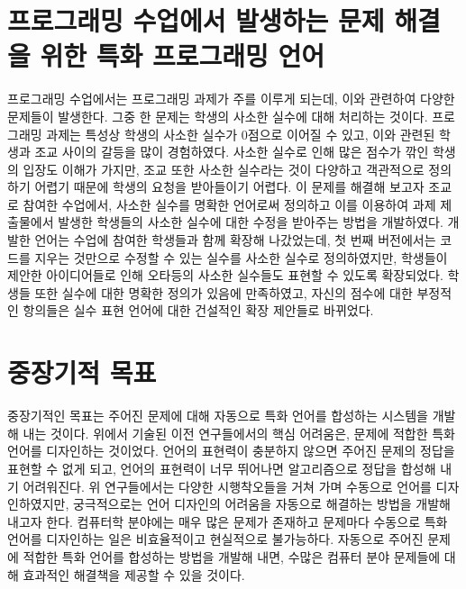 \documentclass[11pt]{article}
\begin{document}
\begin{spacing}{1.145}
\section{프로그래밍 수업에서 발생하는 문제 해결을 위한 특화 프로그래밍 언어}

프로그래밍 수업에서는 프로그래밍 과제가 주를 이루게 되는데, 이와 관련하여 다양한 문제들이 발생한다.
%
그중 한 문제는 학생의 사소한 실수에 대해 처리하는 것이다.
%
프로그래밍 과제는 특성상 학생의 사소한 실수가 0점으로 이어질 수 있고, 이와 관련된 학생과 조교 사이의 갈등을 많이 경험하였다.
%
사소한 실수로 인해 많은 점수가 깎인 학생의 입장도 이해가 가지만, 조교 또한 사소한 실수라는 것이 다양하고 객관적으로 정의하기 어렵기 때문에 학생의 요청을 받아들이기 어렵다.
%
이 문제를 해결해 보고자 조교로 참여한 수업에서, 사소한 실수를 명확한 언어로써 정의하고 이를 이용하여 과제 제출물에서 발생한 학생들의 사소한 실수에 대한 수정을 받아주는 방법을 개발하였다.
%
개발한 언어는 수업에 참여한 학생들과 함께 확장해 나갔었는데, 첫 번째 버전에서는 코드를 지우는 것만으로 수정할 수 있는 실수를 사소한 실수로 정의하였지만, 학생들이 제안한 아이디어들로 인해 오타등의 사소한 실수들도 표현할 수 있도록 확장되었다.
%
학생들 또한 실수에 대한 명확한 정의가 있음에 만족하였고, 자신의 점수에 대한 부정적인 항의들은 실수 표현 언어에 대한 건설적인 확장 제안들로 바뀌었다.


\section{중장기적 목표}

중장기적인 목표는 주어진 문제에 대해 자동으로 특화 언어를 합성하는 시스템을 개발해 내는 것이다.
%
위에서 기술된 이전 연구들에서의 핵심 어려움은, 문제에 적합한 특화 언어를 디자인하는 것이었다.
%
언어의 표현력이 충분하지 않으면 주어진 문제의 정답을 표현할 수 없게 되고, 언어의 표현력이 너무 뛰어나면 알고리즘으로 정답을 합성해 내기 어려워진다.
%
위 연구들에서는 다양한 시행착오들을 거쳐 가며 수동으로 언어를 디자인하였지만, 궁극적으로는 언어 디자인의 어려움을 자동으로 해결하는 방법을 개발해 내고자 한다.
%
컴퓨터학 분야에는 매우 많은 문제가 존재하고 문제마다 수동으로 특화 언어를 디자인하는 일은 비효율적이고 현실적으로 불가능하다.
%
자동으로 주어진 문제에 적합한 특화 언어를 합성하는 방법을 개발해 내면, 수많은 컴퓨터 분야 문제들에 대해 효과적인 해결책을 제공할 수 있을 것이다.












\end{spacing}
\end{document}
